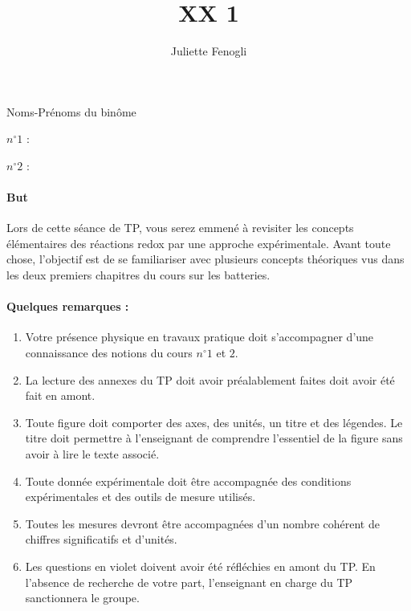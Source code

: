 \documentclass[twoside,a4paper,11pt,addpoints]{exam}%
\title{XX 1}
\date{}
\author{Juliette Fenogli}
\begin{document}
\begin{minipage}{0.33\textwidth}
Noms-Prénoms du binôme
\end{minipage}\begin{minipage}{0.33\textwidth}
$n^\circ 1$ :
\end{minipage}\begin{minipage}{0.33\textwidth}
$n^\circ 2$ :
\end{minipage}




\paragraph*{But} 
Lors de cette séance de TP, vous serez emmené à revisiter les concepts élémentaires des réactions redox par une approche expérimentale. Avant toute chose, l'objectif est de se familiariser avec plusieurs concepts théoriques vus dans les deux premiers chapitres du cours sur les batteries.

\paragraph*{Quelques remarques :}
\begin{enumerate}
\item Votre présence physique en travaux pratique doit s'accompagner d'une connaissance des notions du cours $n^\circ 1$ et $2$.
\item La lecture des annexes du TP doit avoir préalablement faites doit avoir été fait en amont.
\item Toute figure doit comporter des axes, des unités, un titre et des légendes. Le titre doit permettre à l'enseignant de comprendre l'essentiel de la figure sans avoir à lire le texte associé.
\item Toute donnée expérimentale doit être accompagnée des conditions expérimentales et des outils de mesure utilisés.
\item Toutes les mesures devront être accompagnées d'un nombre cohérent de chiffres significatifs et d'unités.%
\item Les questions en {\color{purple} violet} doivent avoir été réfléchies en amont du TP. En l'absence de recherche de votre part, l'enseignant en charge du TP sanctionnera le groupe.
\end{enumerate}
\end{document}

